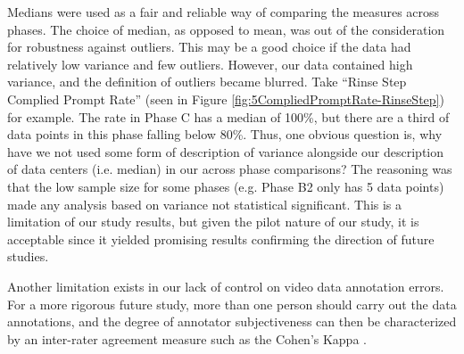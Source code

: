 \documentclass{ut-thesis}
\begin{document}
Medians were used as a fair and reliable way of comparing the measures across phases.  The choice of median, as opposed to mean, was out of the consideration for robustness against outliers.  This may be a good choice if the data had relatively low variance and few outliers.  However, our data contained high variance, and the definition of outliers became blurred.  Take ``Rinse Step Complied Prompt Rate'' (seen in Figure \ref{fig:5CompliedPromptRate-RinseStep}) for example.  The rate in Phase C has a median of 100\%, but there are a third of data points in this phase falling below 80\%.  Thus, one obvious question is, why have we not used some form of description of variance alongside our description of data centers (i.e. median) in our across phase comparisons?  The reasoning was that the low sample size for some phases (e.g. Phase B2 only has 5 data points) made any analysis based on variance not statistical significant.  This is a limitation of our study results, but given the pilot nature of our study, it is acceptable since it yielded promising results confirming the direction of future studies.

Another limitation exists in our lack of control on video data annotation errors.  For a more rigorous future study, more than one person should carry out the data annotations, and the degree of annotator subjectiveness can then be characterized by an inter-rater agreement measure such as the Cohen's Kappa \cite{volkmar2005handbook}.
\end{document}
